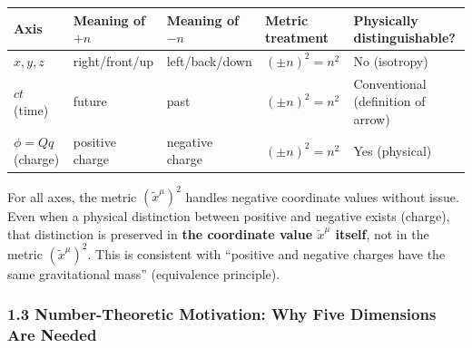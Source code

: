 \documentclass[a4paper,11pt]{article}
\theoremstyle{definition}
\begin{document}
{\def\LTcaptype{none} %
\begin{longtable}[]{@{}
  >{\raggedright\arraybackslash}p{}
  >{\raggedright\arraybackslash}p{}
  >{\raggedright\arraybackslash}p{}
  >{\raggedright\arraybackslash}p{}
  >{\raggedright\arraybackslash}p{}@{}}
\toprule\noalign{}
\begin{minipage}[b]{\linewidth}\raggedright
Axis
\end{minipage} & \begin{minipage}[b]{\linewidth}\raggedright
Meaning of \(+n\)
\end{minipage} & \begin{minipage}[b]{\linewidth}\raggedright
Meaning of \(-n\)
\end{minipage} & \begin{minipage}[b]{\linewidth}\raggedright
Metric treatment
\end{minipage} & \begin{minipage}[b]{\linewidth}\raggedright
Physically distinguishable?
\end{minipage} \\
\midrule\noalign{}
\endhead
\bottomrule\noalign{}
\endlastfoot
\(x, y, z\) & right/front/up & left/back/down & \((\pm n)^2 = n^2\) & No (isotropy) \\
\(ct\) (time) & future & past & \((\pm n)^2 = n^2\) & Conventional (definition of arrow) \\
\(\phi = Qq\) (charge) & positive charge & negative charge & \((\pm n)^2 = n^2\) & Yes (physical) \\
\end{longtable}
}

For all axes, the metric \((\tilde{x}^\mu)^2\) handles negative coordinate values without issue. Even when a physical distinction between positive and negative exists (charge), that distinction is preserved in \textbf{the coordinate value \(\tilde{x}^\mu\) itself}, not in the metric \((\tilde{x}^\mu)^2\). This is consistent with ``positive and negative charges have the same gravitational mass'' (equivalence principle).

\subsubsection{1.3 Number-Theoretic Motivation: Why Five Dimensions Are Needed}\label{number-theoretic-motivation-why-five-dimensions-are-needed}
\end{document}
